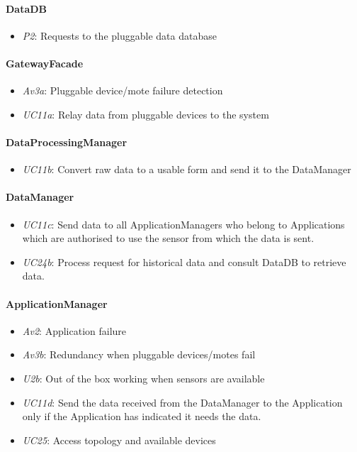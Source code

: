 \documentclass[english]{sareport}
\begin{document}
\paragraph{DataDB}
\begin{itemize}
	\item \emph{P2}: Requests to the pluggable data database
\end{itemize}

\paragraph{GatewayFacade}
\begin{itemize}
	\item \emph{Av3a}: Pluggable device/mote failure detection
	\item \emph{UC11a}: Relay data from pluggable devices to the system
\end{itemize}

\paragraph{DataProcessingManager}
\begin{itemize}
	\item \emph{UC11b}: Convert raw data to a usable form and send it to the DataManager
\end{itemize}

\paragraph{DataManager}
\begin{itemize}
	\item \emph{UC11c}: Send data to all ApplicationManagers who belong to Applications which are authorised to use the sensor from which the data is sent.
	\item \emph{UC24b}: Process request for historical data and consult DataDB to retrieve data.
\end{itemize}

\paragraph{ApplicationManager}
\begin{itemize}
	\item \emph{Av2}: Application failure
	\item \emph{Av3b}: Redundancy when pluggable devices/motes fail
	\item \emph{U2b}: Out of the box working when sensors are available
	\item \emph{UC11d}: Send the data received from the DataManager to the Application only if the Application has indicated it needs the data.
	\item \emph{UC25}: Access topology and available devices
\end{itemize}
\end{document}
